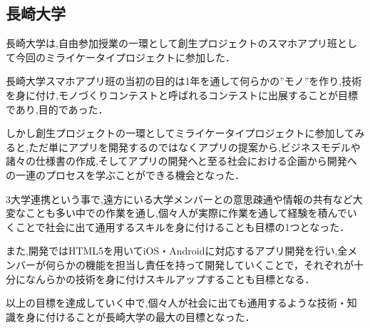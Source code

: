 \subsection{長崎大学}
\par
長崎大学は,自由参加授業の一環として創生プロジェクトのスマホアプリ班として今回のミライケータイプロジェクトに参加した．
\par
長崎大学スマホアプリ班の当初の目的は1年を通して何らかの”モノ”を作り,技術を身に付け,モノづくりコンテストと呼ばれるコンテストに出展することが目標であり,目的であった．
\par
しかし創生プロジェクトの一環としてミライケータイプロジェクトに参加してみると,ただ単にアプリを開発するのではなくアプリの提案から,ビジネスモデルや諸々の仕様書の作成,そしてアプリの開発へと至る社会における企画から開発への一連のプロセスを学ぶことができる機会となった．
\par
3大学連携という事で,遠方にいる大学メンバーとの意思疎通や情報の共有など大変なことも多い中での作業を通し,個々人が実際に作業を通して経験を積んでいくことで社会に出て通用するスキルを身に付けることも目標の1つとなった．
\par
また,開発ではHTML5を用いてiOS・Androidに対応するアプリ開発を行い,全メンバーが何らかの機能を担当し責任を持って開発していくことで，それぞれが十分になんらかの技術を身に付けスキルアップすることも目標となる．
\par
以上の目標を達成していく中で,個々人が社会に出ても通用するような技術・知識を身に付けることが長崎大学の最大の目標となった．
